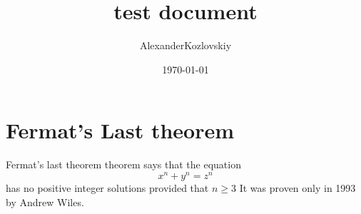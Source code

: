 \documentclass{article}
\title{test document}
\author{AlexanderKozlovskiy}
\date{\today}
\begin{document}
\section{Fermat's Last theorem}

Fermat's last theorem theorem says that the equation 
\[ 
x^n+y^n=z^n 
\] has no positive integer solutions provided that \( n\ge 3 \) It was proven only in 1993 by Andrew Wiles.
\end{document}

